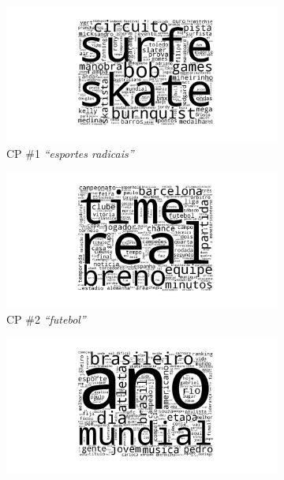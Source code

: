 \documentclass[
    12pt,                %
    oneside,            %
    a4paper,            %
    english,            %
    brazil                %
    ]{abntex2ppgsi}
\begin{document}
\begin{figure}[H]
\centering
    \begin{subfigure}[b]{0.45\textwidth}
        \includegraphics[width=\textwidth]{img/onmtf-tc-1.png}
        \caption{CP \#1 \textit{``esportes radicais''}}
    \end{subfigure}
    \begin{subfigure}[b]{0.45\textwidth}
        \includegraphics[width=\textwidth]{img/onmtf-tc-2.png}
        \caption{CP \#2 \textit{``futebol''}}
    \end{subfigure}
    \begin{subfigure}[b]{0.45\textwidth}
        \includegraphics[width=\textwidth]{img/onmtf-tc-3.png}

\end{subfigure}
\end{figure}
\end{document}
